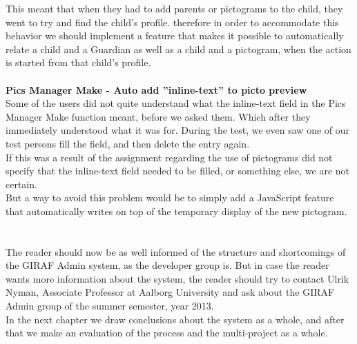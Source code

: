This meant that when they had to add parents or pictograms to the child, they went to try and find the child's profile. therefore in order to accommodate this behavior we should implement a feature that makes it possible to automatically relate a child and a Guardian as well as a child and a pictogram, when the action is started from that child's profile.\\
\\
\textbf{Pics Manager Make - Auto add ''inline-text'' to picto preview}\\
Some of the users did not quite understand what the inline-text field in the Pics Manager Make function meant, before we asked them. Which after they immediately understood what it was for. During the test, we even saw one of our test persons fill the field, and then delete the entry again.\\
If this was a result of the assignment regarding the use of pictograms did not specify that the inline-text field needed to be filled, or something else, we are not certain.\\
But a way to avoid this problem would be to simply add a JavaScript feature that automatically writes on top of the temporary display of the new pictogram.\\
\\
\\
The reader should now be as well informed of the structure and shortcomings of the GIRAF Admin system, as the developer group is. But in case the reader wants more information about the system, the reader should try to contact Ulrik Nyman, Associate Professor at Aalborg University and ask about the GIRAF Admin group of the summer semester, year 2013.\\
In the next chapter we draw conclusions about the system as a whole, and after that we make an evaluation of the process and the multi-project as a whole.


